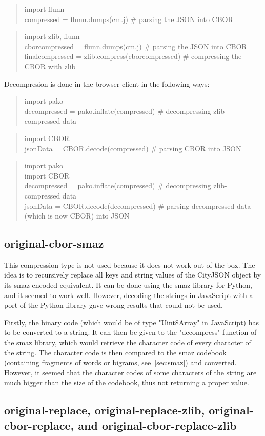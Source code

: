 \blockquote{import flunn\\
compressed = flunn.dumps(cm.j)    \# parsing the JSON into CBOR}

\blockquote{import zlib, flunn\\
cborcompressed = flunn.dumps(cm.j)    \# parsing the JSON into CBOR\\
finalcompressed = zlib.compress(cborcompressed)    \# compressing the CBOR with zlib
}

Decompresion is done in the browser client in the following ways:

\blockquote{import pako\\
decompressed = pako.inflate(compressed)    \# decompressing zlib-compressed data}

\blockquote{import CBOR\\
jsonData = CBOR.decode(compressed)    \# parsing CBOR into JSON}

\blockquote{import pako\\
import CBOR\\
decompressed = pako.inflate(compressed)    \# decompressing zlib-compressed data\\
jsonData = CBOR.decode(decompressed)    \# parsing decompressed data (which is now CBOR) into JSON}

\subsection{original-cbor-smaz}
This compression type is not used because it does not work out of the box.
The idea is to recursively replace all keys and string values of the CityJSON object by its smaz-encoded equivalent.
It can be done using the smaz library for Python, and it seemed to work well.
However, decoding the strings in JavaScript with a port of the Python library gave wrong results that could not be used.

Firstly, the binary code (which would be of type "Uint8Array" in JavaScript) has to be converted to a string.
It can then be given to the "decompress" function of the smaz library, which would retrieve the character code of every character of the string.
The character code is then compared to the smaz codebook (containing fragments of words or bigrams, see~\ref{sec:smaz}) and converted.
However, it seemed that the character codes of some characters of the string are much bigger than the size of the codebook, thus not returning a proper value.

\subsection{original-replace, original-replace-zlib, original-cbor-replace, and original-cbor-replace-zlib}
\label{sec:implreplace}

